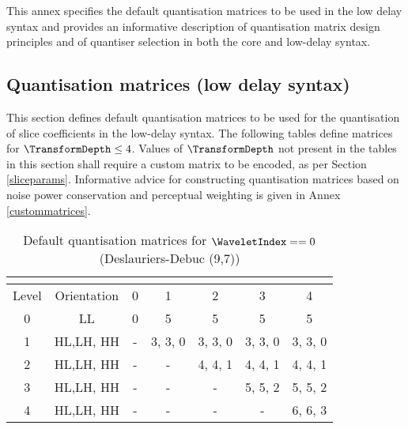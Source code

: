 \label{quantmatrices}

This annex specifies the default quantisation matrices to be used
in the low delay syntax and provides an informative description of quantisation
matrix design principles and of quantiser selection in both the core
and low-delay syntax.

\subsection{Quantisation matrices (low delay syntax)}
\label{defaultquantmatrices}

This section defines default quantisation matrices to be used 
for the quantisation of slice coefficients in the low-delay syntax.
The following tables define matrices for $\TransformDepth\leq 4$. 
Values of $\TransformDepth$ not present in the tables
in this section shall require a custom matrix to be encoded, 
as per Section \ref{sliceparams}. Informative advice for 
constructing quantisation matrices based on noise power 
conservation and perceptual weighting is given in 
Annex \ref{custommatrices}.

\begin{table}[!ht]
\centering
\begin{tabular}{|c|c|c|c|c|c|c|}
\hline
\multicolumn{2}{|c|}{\cellcolor[gray]{0.75}}& \multicolumn{5}{|c|}{\cellcolor[gray]{0.75}{$\TransformDepth$}} \\
\hline
Level & Orientation & 0 & 1 & 2 & 3 & 4 \\
\hline
0 & LL & 0 & 5 & 5 & 5 & 5\\
\hline
1 & HL,LH, HH & - & 3, 3, 0 & 3, 3, 0 & 3, 3, 0 & 3, 3, 0  \\
\hline
2 & HL,LH, HH & - & - & 4, 4, 1 & 4, 4, 1 & 4, 4, 1  \\
\hline
3 & HL,LH, HH & - & - & - & 5, 5, 2 & 5, 5, 2  \\
\hline
4 & HL,LH, HH & - & - & - & - & 6, 6, 3  \\
\hline
\end{tabular}
\caption{Default quantisation matrices for $\WaveletIndex==0$ (Deslauriers-Debuc (9,7)) 
\label{table:qm0}}
\end{table}

